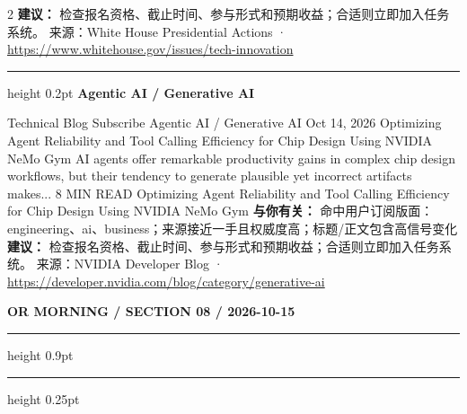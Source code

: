 \documentclass[10.5pt]{ctexart}
\begin{document}
\begin{multicols}{2}
\textbf{建议：} 检查报名资格、截止时间、参与形式和预期收益；合适则立即加入任务系统。
{\footnotesize\color{ormuted} 来源：White House Presidential Actions · \url{https://www.whitehouse.gov/issues/tech-innovation}}
\vspace{2mm}
\hrule height 0.2pt
\vspace{2mm}
{\large\bfseries Agentic AI / Generative AI}\par
Technical Blog Subscribe Agentic AI / Generative AI Oct 14, 2026 Optimizing Agent Reliability and Tool Calling Efficiency for Chip Design Using NVIDIA NeMo Gym AI agents offer remarkable productivity gains in complex chip design workflows, but their tendency to generate plausible yet incorrect artifacts makes... 8 MIN READ Optimizing Agent Reliability and Tool Calling Efficiency for Chip Design Using NVIDIA NeMo Gym 
\textbf{与你有关：} 命中用户订阅版面：engineering、ai、business；来源接近一手且权威度高；标题/正文包含高信号变化
\textbf{建议：} 检查报名资格、截止时间、参与形式和预期收益；合适则立即加入任务系统。
{\footnotesize\color{ormuted} 来源：NVIDIA Developer Blog · \url{https://developer.nvidia.com/blog/category/generative-ai}}
\end{multicols}
\newpage
{\small\bfseries OR MORNING / SECTION 08 / 2026-10-15}
\vspace{2mm}
\hrule height 0.9pt
\vspace{1.5mm}
\hrule height 0.25pt
\vspace{4mm}
\end{document}
